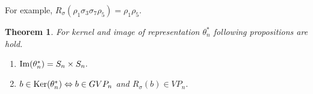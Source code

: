 \documentclass{article}
\newtheorem{theorem}{Theorem}
\begin{document}
For example, $R_{\sigma}(\rho_1\sigma_3\sigma_7\rho_5)=\rho_1\rho_5$. 



\begin{theorem}

For kernel and image of representation $\theta_n^*$ following propositions are hold.

\begin{enumerate}

\item ${\rm Im}(\theta_n^*)=S_n\times S_n.$

\item $b\in {\rm Ker}(\theta_n^*) \Leftrightarrow b\in GVP_n$ and $R_{\sigma}(b)\in VP_n.$

\end{enumerate}

\end{theorem}
\end{document}
